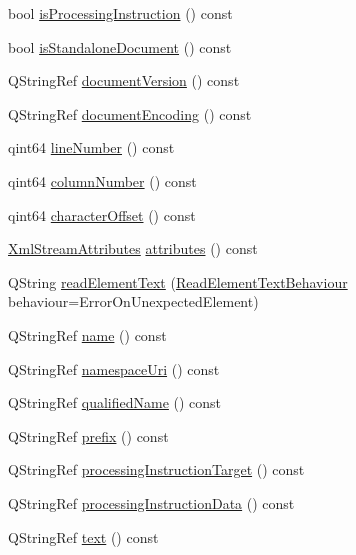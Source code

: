 \begin{DoxyCompactItemize}
bool \hyperlink{class_xml_stream_reader_a66b16a5ab385fbfa167295f41022c37d}{is\+Processing\+Instruction} () const
\item 
bool \hyperlink{class_xml_stream_reader_aa5678c8de5e5efd67e85b60dbda6374f}{is\+Standalone\+Document} () const
\item 
Q\+String\+Ref \hyperlink{class_xml_stream_reader_a6667b8f4c648c8f192802c8091f617fb}{document\+Version} () const
\item 
Q\+String\+Ref \hyperlink{class_xml_stream_reader_a8326fe20290e37d1c1549737cc02d25b}{document\+Encoding} () const
\item 
qint64 \hyperlink{class_xml_stream_reader_a74a3827867942f9904924f2004c4177e}{line\+Number} () const
\item 
qint64 \hyperlink{class_xml_stream_reader_a88724d9577a835b0e8d84ed945c306df}{column\+Number} () const
\item 
qint64 \hyperlink{class_xml_stream_reader_a08a187eb8969ddabf238e1f731bb754a}{character\+Offset} () const
\item 
\hyperlink{class_xml_stream_attributes}{Xml\+Stream\+Attributes} \hyperlink{class_xml_stream_reader_aaa89a6baad93837857847a3ec5d7710a}{attributes} () const
\item 
Q\+String \hyperlink{class_xml_stream_reader_a45f936b88df1b72f39c43d1c41fb9940}{read\+Element\+Text} (\hyperlink{class_xml_stream_reader_aa67823f6737762b7e1a426ac841e29fa}{Read\+Element\+Text\+Behaviour} behaviour=Error\+On\+Unexpected\+Element)
\item 
Q\+String\+Ref \hyperlink{class_xml_stream_reader_a09b44691e1e74daa6bdd4ed465d3c0a2}{name} () const
\item 
Q\+String\+Ref \hyperlink{class_xml_stream_reader_a4ea3344f8632d1cd70edfaddf9a8027c}{namespace\+Uri} () const
\item 
Q\+String\+Ref \hyperlink{class_xml_stream_reader_a1afff37e8245261beb5c31db56912b8c}{qualified\+Name} () const
\item 
Q\+String\+Ref \hyperlink{class_xml_stream_reader_aed2c2d3189639c9f73dc50432c628204}{prefix} () const
\item 
Q\+String\+Ref \hyperlink{class_xml_stream_reader_a66bd483fca16586142dd890cacb9b967}{processing\+Instruction\+Target} () const
\item 
Q\+String\+Ref \hyperlink{class_xml_stream_reader_a2c9146676cc92895abaadc89f6fbc738}{processing\+Instruction\+Data} () const
\item 
Q\+String\+Ref \hyperlink{class_xml_stream_reader_a1d129d0171b231efac34d7ee4480a50f}{text} () const

\end{DoxyCompactItemize}
